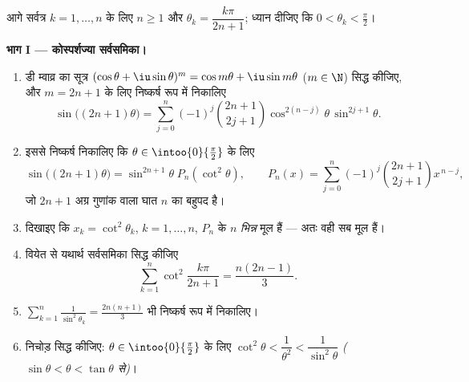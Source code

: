 \begin{problem}[{सप्ताहांत समस्या --- $\zeta(2) = \pi^2/6$ और बर्ट्रांड
परिदृश्य}]
\label{pb:b2:series:1}
आगे सर्वत्र $k
= 1, \dots, n$ के लिए $n \geq 1$ और $\theta_k = \dfrac{k\pi}{2n+1}$; ध्यान दीजिए कि $0 < \theta_k < \frac\pi2$।

\medskip
\noindent\textbf{भाग I --- कोस्पर्शज्या सर्वसमिका।}
\begin{enumerate}
  \item डी म्वाव्र का सूत्र $(\cos\theta +
        \iu\sin\theta)^m = \cos m\theta + \iu\sin m\theta$ ($m
        \in \N$) सिद्ध कीजिए, और $m = 2n + 1$ के लिए
        निष्कर्ष रूप में निकालिए
        \[
        \sin\bigl((2n{+}1)\theta\bigr) = \sum_{j=0}^{n}
        (-1)^j\binom{2n+1}{2j+1}\cos^{2(n-j)}\theta\,
        \sin^{2j+1}\theta .
        \]
  \item इससे निष्कर्ष निकालिए कि $\theta \in \intoo{0}{\frac\pi2}$ के लिए
        \[
        \sin\bigl((2n{+}1)\theta\bigr) =
        \sin^{2n+1}\theta\; P_n(\cot^2\theta),
        \qquad
        P_n(x) = \sum_{j=0}^{n}
        (-1)^j\binom{2n+1}{2j+1}x^{\,n-j},
        \]
        जो $2n
        + 1$ अग्र गुणांक वाला घात $n$ का बहुपद है।
  \item दिखाइए कि $x_k = \cot^2\theta_k$, $k = 1, \dots, n$, $P_n$ के $n$ \emph{भिन्न} मूल हैं --- अतः
        वही सब मूल हैं।
  \item वियेत से यथार्थ सर्वसमिका सिद्ध कीजिए
        \[
        \sum_{k=1}^{n} \cot^2\frac{k\pi}{2n+1}
        = \frac{n(2n-1)}{3}.
        \]
  \item $\displaystyle\sum_{k=1}^{n}
        \frac{1}{\sin^2\theta_k} = \frac{2n(n+1)}{3}$ भी निष्कर्ष रूप में निकालिए।
  \item निचोड़ सिद्ध कीजिए: $\theta \in
        \intoo{0}{\frac\pi2}$ के लिए $\cot^2\theta < \dfrac1{\theta^2} <
        \dfrac{1}{\sin^2\theta}$ \emph{($\sin\theta < \theta <
        \tan\theta$ से)}।
\end{enumerate}


\end{problem}
